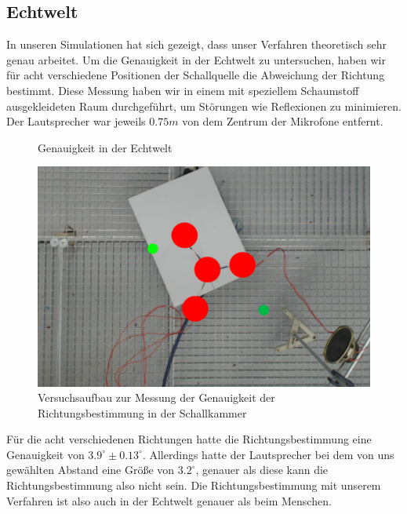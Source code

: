 \subsection{Echtwelt}
In unseren Simulationen hat sich gezeigt, dass unser Verfahren theoretisch sehr genau arbeitet. Um die Genauigkeit in der Echtwelt zu untersuchen, haben wir für acht verschiedene Positionen der Schallquelle die Abweichung der Richtung bestimmt. Diese Messung haben wir in einem mit speziellem Schaumstoff~\cite{BASOTECT} ausgekleideten Raum durchgeführt, um Störungen wie Reflexionen zu minimieren. Der Lautsprecher war jeweils $0.75m$ von dem Zentrum der Mikrofone entfernt.
\begin{minipage}{0.49\linewidth}
\begin{figure}[H]
  \centering
  \resizebox{!}{0.7\textwidth}{}
  \caption{Genauigkeit in der Echtwelt}
  \label{fig:real}
\end{figure}
\end{minipage}\hfill{}%
\begin{minipage}{0.49\linewidth}
\begin{figure}[H]
  \centering
  \includegraphics[width=\textwidth]{img/pos_1}
  \caption{Versuchsaufbau zur Messung der Genauigkeit der Richtungsbestimmung in der Schallkammer}
  \label{fig:real_reral}
\end{figure}
\end{minipage}%
Für die acht verschiedenen Richtungen hatte die Richtungsbestimmung eine Genauigkeit von $3.9^\circ \pm 0.13^\circ$. Allerdings hatte der Lautsprecher bei dem von uns gewählten Abstand eine Größe von $3.2^\circ$, genauer als diese kann die Richtungsbestimmung also nicht sein. Die Richtungsbestimmung mit unserem Verfahren ist also auch in der Echtwelt genauer als beim Menschen.
